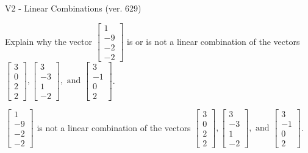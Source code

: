 \begin{exercise}
  \begin{exerciseTitle}V2 - Linear Combinations (ver. 629)\end{exerciseTitle}
  \begin{exerciseStatement}
    Explain why the vector \(\left[\begin{array}{c}
1 \\
-9 \\
-2 \\
-2
\end{array}\right]\)  is or is not a linear 
	combination of the vectors \(\left[\begin{array}{c}
3 \\
0 \\
2 \\
2
\end{array}\right] , \left[\begin{array}{c}
3 \\
-3 \\
1 \\
-2
\end{array}\right] , \text{ and } \left[\begin{array}{c}
3 \\
-1 \\
0 \\
2
\end{array}\right]\).
	


  \end{exerciseStatement}
  \begin{exerciseAnswer}
   \(\left[\begin{array}{c}
1 \\
-9 \\
-2 \\
-2
\end{array}\right]\) 
  	 is not  
	a linear combination of the vectors \(\left[\begin{array}{c}
3 \\
0 \\
2 \\
2
\end{array}\right] , \left[\begin{array}{c}
3 \\
-3 \\
1 \\
-2
\end{array}\right] , \text{ and } \left[\begin{array}{c}
3 \\
-1 \\
0 \\
2
\end{array}\right]\).

	
  


  \end{exerciseAnswer}
\end{exercise}